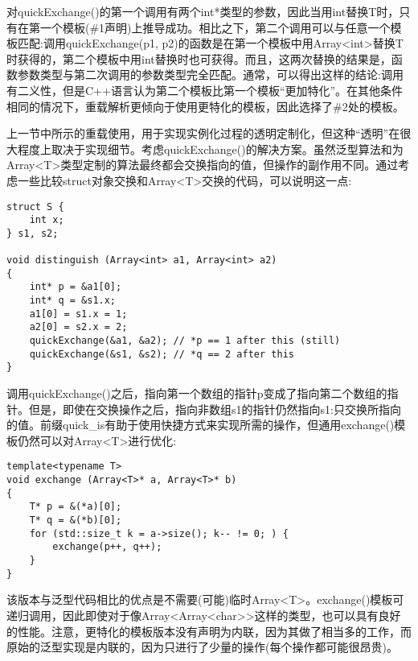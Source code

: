 对quickExchange()的第一个调用有两个int*类型的参数，因此当用int替换T时，只有在第一个模板(\#1声明)上推导成功。相比之下，第二个调用可以与任意一个模板匹配:调用quickExchange(p1, p2)的函数是在第一个模板中用Array<int>替换T时获得的，第二个模板中用int替换时也可获得。而且，这两次替换的结果是，函数参数类型与第二次调用的参数类型完全匹配。通常，可以得出这样的结论:调用有二义性，但是C++语言认为第二个模板比第一个模板“更加特化”。在其他条件相同的情况下，重载解析更倾向于使用更特化的模板，因此选择了\#2处的模板。



上一节中所示的重载使用，用于实现实例化过程的透明定制化，但这种“透明”在很大程度上取决于实现细节。考虑quickExchange()的解决方案。虽然泛型算法和为Array<T>类型定制的算法最终都会交换指向的值，但操作的副作用不同。通过考虑一些比较struct对象交换和Array<T>交换的代码，可以说明这一点:

\begin{lstlisting}[style=styleCXX]
struct S {
	int x;
} s1, s2;

void distinguish (Array<int> a1, Array<int> a2)
{
	int* p = &a1[0];
	int* q = &s1.x;
	a1[0] = s1.x = 1;
	a2[0] = s2.x = 2;
	quickExchange(&a1, &a2); // *p == 1 after this (still)
	quickExchange(&s1, &s2); // *q == 2 after this
}
\end{lstlisting}


调用quickExchange()之后，指向第一个数组的指针p变成了指向第二个数组的指针。但是，即使在交换操作之后，指向非数组s1的指针仍然指向s1:只交换所指向的值。前缀quick\_is有助于使用快捷方式来实现所需的操作，但通用exchange()模板仍然可以对Array<T>进行优化:

\begin{lstlisting}[style=styleCXX]
template<typename T>
void exchange (Array<T>* a, Array<T>* b)
{
	T* p = &(*a)[0];
	T* q = &(*b)[0];
	for (std::size_t k = a->size(); k-- != 0; ) {
		exchange(p++, q++);
	}
}
\end{lstlisting}

该版本与泛型代码相比的优点是不需要(可能)临时Array<T>。exchange()模板可递归调用，因此即使对于像Array<Array<char>>这样的类型，也可以具有良好的性能。注意，更特化的模板版本没有声明为内联，因为其做了相当多的工作，而原始的泛型实现是内联的，因为只进行了少量的操作(每个操作都可能很昂贵)。









